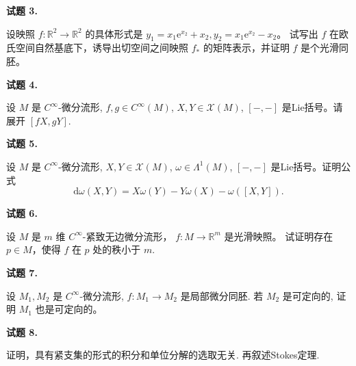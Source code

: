\textbf{试题 3.}

\qquad 设映照 $f: \mathbb{R}^{2} \rightarrow \mathbb{R}^{2}$ 的具体形式是 $y_{1}=x_{1} \mathrm{e}^{x_{2}}+x_{2}, y_{2}=x_{1} \mathrm{e}^{x_{2}}-x_{2}$。
试写出 $f$ 在欧氏空间自然基底下，诱导出切空间之间映照 $f_{*}$ 的矩阵表示，并证明 $f$ 是个光滑同胚。

\textbf{试题 4.}

\qquad 设 $M$ 是 $C^{\infty}$-微分流形, $f, g \in C^{\infty}(M)$, 
$X, Y \in \mathscr{X}(M)$, $[-,-]$ 是Lie括号。请展开 $[f X, g Y]$.

\textbf{试题 5.}

\qquad 设 $M$ 是 $C^{\infty}$-微分流形, $X, Y \in \mathscr{X}(M)$, 
$\omega \in \Lambda^{1}(M)$, $[-,-]$ 是Lie括号。证明公式
$$\mathrm{d} \omega(X, Y)=X \omega(Y)-Y \omega(X)-\omega([X, Y]).$$

\textbf{试题 6.}

\qquad 设 $M$ 是 $m$ 维 $C^{\infty}$-紧致无边微分流形， 
$f: M \rightarrow \mathbb{R}^{m}$ 是光滑映照。
试证明存在 $p \in M$，使得 $f$ 在 $p$ 处的秩小于 $m$.

\textbf{试题 7.}

\qquad 设 $M_{1}, M_{2}$ 是 $C^{\infty}$-微分流形, 
$f: M_{1} \rightarrow M_{2}$ 是局部微分同胚. 
若 $M_{2}$ 是可定向的, 证明 $M_{1}$ 也是可定向的。

\textbf{试题 8.}

\qquad 证明，具有紧支集的形式的积分和单位分解的选取无关. 再叙述Stokes定理.